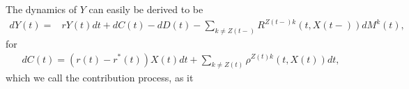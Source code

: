 \documentclass[12pt]{article}
\theoremstyle{my_thm}
\begin{document}









The dynamics of $Y$ can easily be derived to be
\begin{align}
dY(t)=&rY(t) dt + dC(t)-dD(t)-
\sum_{k \neq Z(t-)}  R^{Z(t-)k}(t,X(t-)) dM^k(t), \label{eq:AAC}
\end{align}
for 
\begin{gather*}
dC(t)=(r(t)-r^*(t))X(t)dt+\sum_{k\neq Z(t)} \rho^{Z(t)k}(t,X(t)) dt,
\end{gather*}
which we call the contribution process, as it 
\end{document}
